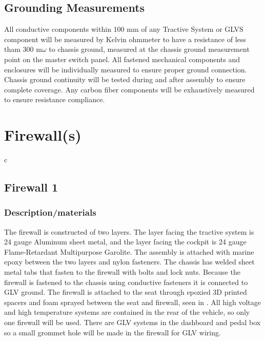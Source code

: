 \documentclass{article}
\begin{document}
\subsection{Grounding Measurements}
All conductive components within 100 mm of any Tractive System or GLVS component will be measured by Kelvin ohmmeter to have a resistance of less tham 300 m$\omega$ to chassis ground, measured at the chassis ground measurement point on the master switch panel. All fastened mechanical components and enclosures will be individually measured to ensure proper ground connection. Chassis ground continuity will be tested during and after assembly to ensure complete coverage. Any carbon fiber components will be exhaustively measured to ensure resistance compliance.

\section{Firewall(s)}\label{firewalls}c
\subsection{Firewall 1}\label{firewall_1}
\subsubsection{Description/materials}
The firewall is constructed of two layers. The layer facing the tractive system is 24 gauge Aluminum sheet metal, and the layer facing the cockpit is 24 gauge Flame-Retardant Multipurpose Garolite. The assembly is attached with marine epoxy between the two layers and nylon fasteners. The chassis has welded sheet metal tabs that fasten to the firewall with bolts and lock nuts. Because the firewall is fastened to the chassis using conductive fasteners it is connected to GLV ground. The firewall is attached to the seat through epoxied 3D printed spacers and foam sprayed between the seat and firewall, seen in .
All high voltage and high temperature systems are contained in the rear of the vehicle, so only one firewall will be used. There are GLV systems in the dashboard and pedal box so a small grommet hole will be made in the firewall for GLV wiring.
\end{document}
